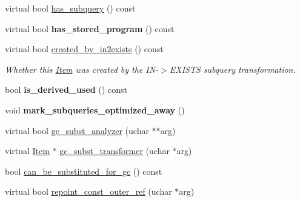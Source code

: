 \begin{DoxyCompactItemize}
virtual bool \mbox{\hyperlink{classItem_a555481d359fe1f802b42497d4c39444f}{has\+\_\+subquery}} () const
\item 
\mbox{\label{classItem_a04ff5e7a8974366d27c1b11a3244518d}} 
virtual bool {\bfseries has\+\_\+stored\+\_\+program} () const
\item 
\mbox{\label{classItem_a339485db1a34ae56e5c9039d955aba3a}} 
virtual bool \mbox{\hyperlink{classItem_a339485db1a34ae56e5c9039d955aba3a}{created\+\_\+by\+\_\+in2exists}} () const
\begin{DoxyCompactList}\small\item\em Whether this \mbox{\hyperlink{classItem}{Item}} was created by the IN-\/$>$E\+X\+I\+S\+TS subquery transformation. \end{DoxyCompactList}\item 
\mbox{\label{classItem_adab31a539e63073e8b5e44121fec6129}} 
bool {\bfseries is\+\_\+derived\+\_\+used} () const
\item 
\mbox{\label{classItem_a25f71a381276e045473f21b8f628e366}} 
void {\bfseries mark\+\_\+subqueries\+\_\+optimized\+\_\+away} ()
\item 
virtual bool \mbox{\hyperlink{classItem_aea5d6f41e9cd5d17d8e6e8d44bee9c3e}{gc\+\_\+subst\+\_\+analyzer}} (uchar $\ast$$\ast$arg)
\item 
virtual \mbox{\hyperlink{classItem}{Item}} $\ast$ \mbox{\hyperlink{classItem_a09908dd05d73b9ca1eda2ed8b00d87f4}{gc\+\_\+subst\+\_\+transformer}} (uchar $\ast$arg)
\item 
bool \mbox{\hyperlink{classItem_a6412d8808519ea336ea6d85ea5efc720}{can\+\_\+be\+\_\+substituted\+\_\+for\+\_\+gc}} () const
\item 
virtual bool \mbox{\hyperlink{classItem_a8deff5e761c2a4fc89e60df1389da969}{repoint\+\_\+const\+\_\+outer\+\_\+ref}} (uchar $\ast$arg)
\end{DoxyCompactItemize}
